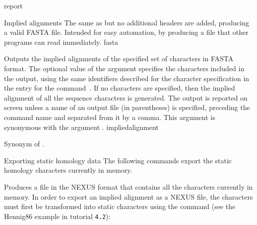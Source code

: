 \begin{command}{report}{}
\begin{arguments}
\begin{argumentgroup}{Implied alignments}
            {The same as  but no additional headers
                are added, producing a valid FASTA file. Intended for easy
                automation, by producing a file that other programs can read
                immediately.}
                {fasta}

                {Outputs the implied alignments of the specified
                set of characters in FASTA format. The optional value of the
                argument specifies the characters included
                in the output, using the same identifiers described for the
                character specification in the entry for the command~. If no
                characters are specified, then the implied alignment of all the
                sequence characters is generated. The output is reported on
                screen unless a name of an output file (in parentheses) is
                specified, preceding the command name and separated from it by a
                comma. This argument is synonymous with the argument
                .}
                {impliedalignment}

                {Synonym of .}
                {}

        \end{argumentgroup}

        \begin{argumentgroup}{Exporting static homology data}
            {The following commands export the static homology characters
            currently in memory.}

                {Produces a file in the NEXUS format that contains all the
                characters currently in memory.  In
                order to export an implied alignment as a NEXUS file, the
                characters must first be transformed into static characters
                using the  command (see the Hennig86 example in tutorial \texttt{4.2}): 
                \begin{flushleft}
                     \\
                \end{flushleft}}
                {}
                

\end{argumentgroup}
\end{arguments}
\end{command}
